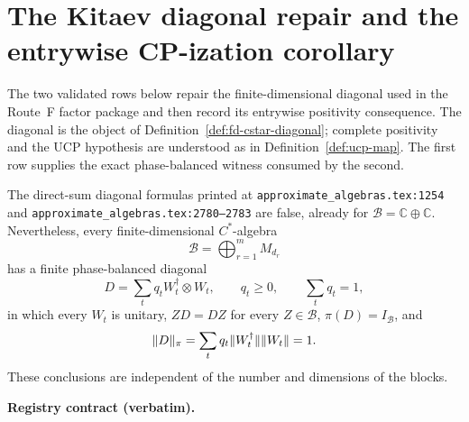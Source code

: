 \section{The Kitaev diagonal repair and the entrywise CP-ization corollary}\label{sec:kitaev-diagonal}

The two validated rows below repair the finite-dimensional diagonal used in the Route~F
factor package and then record its entrywise positivity consequence.  The diagonal is the
object of Definition~\ref{def:fd-cstar-diagonal}; complete positivity and the UCP hypothesis
are understood as in Definition~\ref{def:ucp-map}.  The first row supplies the exact
phase-balanced witness consumed by the second.

\begin{lemma}\label{lem:kitaev-diagonal-repair}
The direct-sum diagonal formulas printed at
\texttt{approximate\_algebras.tex:1254} and
\texttt{approximate\_algebras.tex:2780--2783} are false, already for
$\mathcal B=\mathbb C\oplus\mathbb C$.  Nevertheless, every finite-dimensional
$C^{*}$-algebra
\[
  \mathcal B=\bigoplus_{r=1}^{m}M_{d_r}
\]
has a finite phase-balanced diagonal
\[
  D=\sum_t q_t W_t^{\dagger}\otimes W_t,
  \qquad q_t\ge0,
  \qquad \sum_tq_t=1,
\]
in which every $W_t$ is unitary, $ZD=DZ$ for every $Z\in\mathcal B$,
$\pi(D)=I_{\mathcal B}$, and
\[
  \lVert D\rVert_{\pi}
  =\sum_tq_t\lVert W_t^{\dagger}\rVert\lVert W_t\rVert=1.
\]
These conclusions are independent of the number and dimensions of the blocks.
\end{lemma}

\noindent\textbf{Registry contract (verbatim).}

